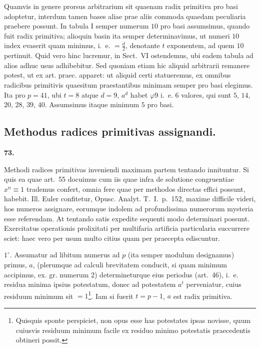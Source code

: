 \documentclass[12pt,a4paper]{article}
\theoremstyle{plain}
\theoremstyle{definition}
\theoremstyle{remark}
\begin{document}
Quamvis in genere prorsus arbitrarium sit quaenam radix primitiva pro basi adoptetur, interdum tamen bases aliae prae aliis commoda quaedam peculiaria praebere possunt. In tabula I semper numerum $10$ pro basi assumsimus, quando fuit radix primitiva; alioquin basin ita semper determinavimus, ut numeri $10$ index evaserit quam minimus, i.~e. $=\frac{d}{2}$, denotante $t$ exponentem, ad quem $10$ pertinuit. Quid vero hinc lucremur, in Sect.~VI ostendemus, ubi eadem tabula ad alios adhuc usus adhibebitur. Sed quoniam etiam hic aliquid arbitrarii remanere potest, ut ex art. praec. apparet: ut aliquid certi statueremus, ex omnibus radicibus primitivis quaesitum praestantibus minimam semper pro basi elegimus. Ita pro $p=41$, ubi $t=8$ atque $d=9$, $a^d$ habet $\varphi 9$ i.~e. $6$ valores, qui sunt $5$, $14$, $20$, $28$, $39$, $40$. Assumsimus itaque minimum $5$ pro basi.

\subsection*{Methodus radices primitivas assignandi.}

\setcounter{satz}{73}
\addtocounter{satz}{-1}
\textbf{73.}

Methodi radices primitivas inveniendi maximam partem tentando innituntur. Si quis ea quae art.~55 docuimus cum iis quae infra de solutione congruentiae $x^n \equiv 1$ trademus confert, omnia fere quae per methodos directas effici possunt, habebit. Ill. Euler confitetur, Opusc. Analyt. T.~I.~p.~152, maxime difficile videri, hos numeros assignare, eorumque indolem ad profundissima numerorum mysteria esse referendam. At tentando satis expedite sequenti modo determinari possunt. Exercitatus operationis prolixitati per multifaria artificia particularia succurrere sciet: haec vero per usum multo citius quam per praecepta ediscuntur.

$1^\circ$. Assumatur ad libitum numerus ad $p$ (ita semper modulum designamus) primus, $a$, (plerumque ad calculi brevitatem conducit, si quam minimum accipimus, ex. gr. numerum $2$) determineturque eius periodus (art.~46), i.~e. residua minima ipsius potestatum, donec ad potestatem $a^t$ perveniatur, cuius residuum minimum sit $=1$\footnote{Quisquis sponte perspiciet, non opus esse has potestates ipsas novisse, quum cuiusvis residuum minimum facile ex residuo minimo potestatis praecedentis obtineri possit.}. Iam si fuerit $t=p-1$, $a$ est radix primitiva.
\end{document}
